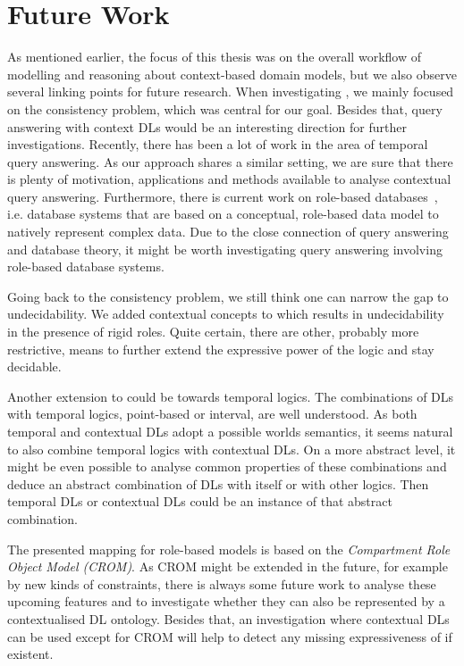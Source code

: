 \section{Future Work}
\label{sec:future-work}

As mentioned earlier, the focus of this thesis was on the overall workflow of modelling and
reasoning about context-based domain models, but we also observe several linking points for future
research. When investigating \LMLO, we mainly focused on the consistency problem, which was central
for our goal. Besides that, query answering with context DLs would be an interesting direction for
further investigations. Recently, there has been a lot of work in the area of temporal query
answering. As our approach shares a similar setting, we are sure that there is plenty of motivation,
applications and methods available to analyse contextual query answering. Furthermore, there is
current work on role-based databases~\cite{JaKV-ADBIS16}, i.e. database systems that are based on a
conceptual, role-based data model to natively represent complex data. Due to the close connection of
query answering and database theory, it might be worth investigating query answering involving
role-based database systems.

Going back to the consistency problem, we still think one can narrow the gap to undecidability. We
added contextual concepts to \LMLO which results in undecidability in the presence of rigid
roles. Quite certain, there are other, probably more restrictive, means to further extend the
expressive power of the logic and stay decidable.

Another extension to \LMLO could be towards temporal logics. The combinations of DLs with
temporal logics, point-based or interval, are well understood. As both temporal and contextual DLs
adopt a possible worlds semantics, it seems natural to also combine temporal logics with contextual
DLs. On a more abstract level, it might be even possible to analyse common properties of these
combinations and deduce an abstract combination of DLs with itself or with other logics. Then
temporal DLs or contextual DLs could be an instance of that abstract combination.

The presented mapping for role-based models is based on the \emph{Compartment Role Object Model
  (CROM)}. As CROM might be extended in the future, for example by new kinds of constraints,
there is always some future work to analyse these upcoming features and to investigate whether they can
also be represented by a contextualised DL ontology.  Besides that, an investigation where contextual
DLs can be used except for CROM will help to detect any missing expressiveness of \LMLO if existent.

